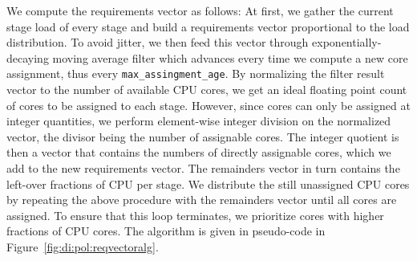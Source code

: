 \documentclass[12pt,a4paper]{book}
\DeclarePairedDelimiter\floor{\lfloor}{\rfloor}
\begin{document}

We compute the requirements vector as follows:
At first, we gather the current stage load of every stage and build a requirements vector proportional to the load distribution.
To avoid jitter, we then feed this vector through exponentially-decaying moving average filter which advances every time we compute a new core assignment, thus every \lstinline[style=figurecpp]{max_assingment_age}.
By normalizing the filter result vector to the number of available CPU cores, we get an ideal floating point count of cores to be assigned to each stage.
However, since cores can only be assigned at integer quantities, we perform element-wise integer division on the normalized vector, the divisor being the number of assignable cores.
The integer quotient is then a vector that contains the numbers of directly assignable cores, which we add to the new requirements vector.
The remainders vector in turn contains the left-over fractions of CPU per stage.
We distribute the still unassigned CPU cores by repeating the above procedure with the remainders vector until all cores are assigned.
To ensure that this loop terminates, we prioritize cores with higher fractions of CPU cores.
The algorithm is given in pseudo-code in Figure~\ref{fig:di:pol:reqvectoralg}.
\end{document}
